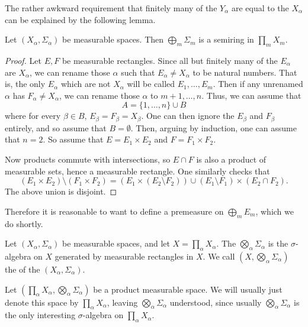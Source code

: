 The rather awkward requirement that finitely many of the $Y_{\alpha}$ are equal to the $X_{\alpha}$ can be explained by the following lemma.

\begin{lemma}
Let $(X_{\alpha}, \Sigma_{\alpha})$ be measurable spaces.
Then $\bigoplus_{m} \Sigma_{m}$ is a semiring in $\prod_{m} X_{m}$.
\end{lemma}
\begin{proof}
Let $E, F$ be measurable rectangles.
Since all but finitely many of the $E_{\alpha}$ are $X_{\alpha}$, we can rename those $\alpha$ such that $E_{\alpha} \neq X_{\alpha}$ to be natural numbers.
That is, the only $E_{\alpha}$ which are not $X_{\alpha}$ will be called $E_{1}, \dots, E_{m}$.
Then if any unrenamed $\alpha$ has $F_{\alpha} \neq X_{\alpha}$, we can rename those $\alpha$ to $m+1, \dots, n$.
Thus, we can assume that
\[A = \{1, \dots, n\} \cup B\]
where for every $\beta \in B$, $E_{\beta} = F_{\beta} = X_{\beta}$.
One can then ignore the $E_{\beta}$ and $F_{\beta}$ entirely, and so assume that $B = \emptyset$.
Then, arguing by induction, one can assume that $n = 2$.
So assume that $E = E_{1} \times E_{2}$ and $F = F_{1} \times F_{2}$.

Now products commute with intersections, so $E \cap F$ is also a product of measurable sets, hence a measurable rectangle.
One similarly checks that
\[(E_{1} \times E_{2}) \setminus (F_{1} \times F_{2}) = (E_{1} \times (E_{2} \setminus F_{2})) \cup (E_{1} \setminus F_{1}) \times (E_{2} \cap F_{2}).\]
The above union is disjoint.
\end{proof}

Therefore it is reasonable to want to define a premeasure on $\bigoplus_{m} E_{m}$, which we do shortly.

\begin{definition}
Let $(X_{\alpha}, \Sigma_{\alpha})$ be measurable spaces, and let $X = \prod_{\alpha} X_{\alpha}$.
The  $\bigotimes_{\alpha} \Sigma_{\alpha}$ is the $\sigma$-algebra on $X$ generated by measurable rectangles in $X$.
We call $(X, \bigotimes_{\alpha} \Sigma_{\alpha})$ the  of the $(X_{\alpha}, \Sigma_{\alpha})$.
\end{definition}

Let $(\prod_{\alpha} X_{\alpha}, \bigotimes_{\alpha} \Sigma_{\alpha})$ be a product measurable space. We will usually just denote this space by $\prod_{\alpha} X_{\alpha}$, leaving $\bigotimes_{\alpha} \Sigma_{\alpha}$ understood, since usually $\bigotimes_{\alpha} \Sigma_{\alpha}$ is the only interesting $\sigma$-algebra on $\prod_{\alpha} X_{\alpha}$.

